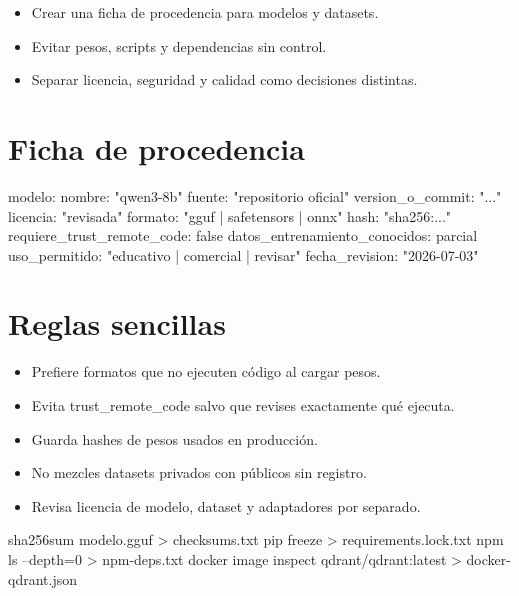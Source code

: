 \documentclass[11pt,a4paper]{book}
\begin{document}
\begin{itemize}\item Crear una ficha de procedencia para modelos y datasets.\end{itemize}
\begin{itemize}\item Evitar pesos, scripts y dependencias sin control.\end{itemize}
\begin{itemize}\item Separar licencia, seguridad y calidad como decisiones distintas.\end{itemize}
\section{Ficha de procedencia}
\begin{codebox}
modelo:
  nombre: "qwen3-8b"
  fuente: "repositorio oficial"
  version_o_commit: "..."
  licencia: "revisada"
  formato: "gguf | safetensors | onnx"
  hash: "sha256:..."
  requiere_trust_remote_code: false
  datos_entrenamiento_conocidos: parcial
  uso_permitido: "educativo | comercial | revisar"
  fecha_revision: "2026-07-03"
\end{codebox}
\section{Reglas sencillas}
\begin{itemize}\item Prefiere formatos que no ejecuten código al cargar pesos.\end{itemize}
\begin{itemize}\item Evita trust\_remote\_code salvo que revises exactamente qué ejecuta.\end{itemize}
\begin{itemize}\item Guarda hashes de pesos usados en producción.\end{itemize}
\begin{itemize}\item No mezcles datasets privados con públicos sin registro.\end{itemize}
\begin{itemize}\item Revisa licencia de modelo, dataset y adaptadores por separado.\end{itemize}
\begin{codebox}
sha256sum modelo.gguf > checksums.txt
pip freeze > requirements.lock.txt
npm ls --depth=0 > npm-deps.txt
docker image inspect qdrant/qdrant:latest > docker-qdrant.json
\end{codebox}
\end{document}
